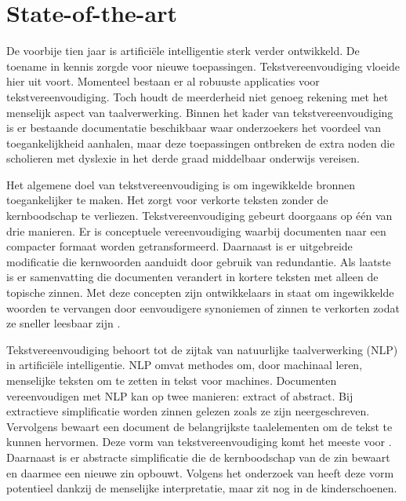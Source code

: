 
\section{State-of-the-art}%
\label{sec:state-of-the-art}

De voorbije tien jaar is artificiële intelligentie sterk verder ontwikkeld. De toename in kennis zorgde voor nieuwe toepassingen. Tekstvereenvoudiging vloeide hier uit voort. Momenteel bestaan er al robuuste applicaties voor tekstvereenvoudiging. Toch houdt de meerderheid niet genoeg rekening met het menselijk aspect van taalverwerking. Binnen het kader van tekstvereenvoudiging is er bestaande documentatie beschikbaar waar onderzoekers het voordeel van toegankelijkheid aanhalen, maar deze toepassingen ontbreken de extra noden die scholieren met dyslexie in het derde graad middelbaar onderwijs vereisen.

Het algemene doel van tekstvereenvoudiging is om ingewikkelde bronnen toegankelijker te maken. Het zorgt voor verkorte teksten zonder de kernboodschap te verliezen. Tekstvereenvoudiging \newline gebeurt doorgaans op één van drie manieren. Er is conceptuele vereenvoudiging waarbij documenten naar een compacter formaat worden getransformeerd. Daarnaast is er uitgebreide modificatie die kernwoorden aanduidt door gebruik van redundantie. Als laatste is er samenvatting die documenten verandert in kortere teksten met alleen de topische zinnen. Met deze concepten zijn ontwikkelaars in staat om ingewikkelde woorden te vervangen door eenvoudigere synoniemen of zinnen te verkorten zodat ze sneller leesbaar zijn \autocite{Siddharthan2014}.

Tekstvereenvoudiging behoort tot de zijtak van natuurlijke taalverwerking (NLP) in artificiële intelligentie. NLP omvat methodes om, door machinaal leren, menselijke teksten om te zetten in tekst voor machines. Documenten vereenvoudigen met NLP kan op twee manieren: extract of abstract. Bij extractieve simplificatie worden zinnen gelezen zoals ze zijn neergeschreven. Vervolgens bewaart een document de belangrijkste taalelementen om de tekst te kunnen hervormen. Deze vorm van tekstvereenvoudiging komt het meeste voor \autocite{Sciforce2020}. Daarnaast is er abstracte simplificatie die de kernboodschap van de zin bewaart en daarmee een nieuwe zin opbouwt. Volgens het onderzoek van \textcite{Chowdhary2020} heeft deze vorm potentieel dankzij de menselijke interpretatie, maar zit nog in de kinderschoenen.

